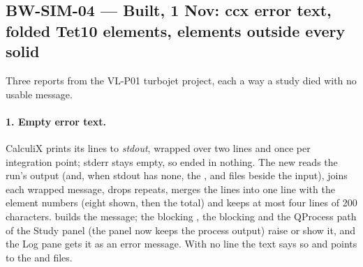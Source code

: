 \subsection{BW-SIM-04 --- Built, 1 Nov: ccx error text, folded Tet10 elements, elements outside every solid}\label{sec:sim-ccx-diag-built}

Three reports from the VL-P01 turbojet project, each a way a study died with no usable message.

\paragraph{1. Empty error text.} CalculiX prints its  lines to \emph{stdout}, wrapped over two lines and once per
integration point; stderr stays empty, so  ended in nothing. The new
 reads the run's output (and, when stdout has none, the ,  and
 files beside the input), joins each wrapped message, drops repeats, merges the
 lines into one line with the element numbers (eight shown, then the total)
and keeps at most four lines of 200 characters.  builds the message; the blocking , the
blocking and the QProcess path of the Study panel (the panel now keeps the process output) raise or show it, and the Log pane gets
it as an error message. With no  line the text says so and points to the  and  files.

